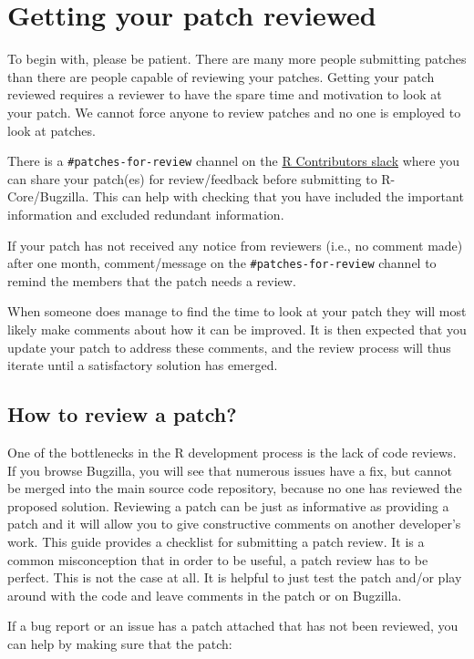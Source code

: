 \documentclass[
  letterpaper,
  DIV=11,
  numbers=noendperiod]{scrreprt}
\begin{document}
\section{Getting your patch reviewed}\label{PatchesReview}

To begin with, please be patient. There are many more people submitting
patches than there are people capable of reviewing your patches. Getting
your patch reviewed requires a reviewer to have the spare time and
motivation to look at your patch. We cannot force anyone to review
patches and no one is employed to look at patches.

There is a \texttt{\#patches-for-review} channel on the
\href{https://r-contributors.slack.com/}{R Contributors slack} where you
can share your patch(es) for review/feedback before submitting to
R-Core/Bugzilla. This can help with checking that you have included the
important information and excluded redundant information.

If your patch has not received any notice from reviewers (i.e., no
comment made) after one month, comment/message on the
\texttt{\#patches-for-review} channel to remind the members that the
patch needs a review.

When someone does manage to find the time to look at your patch they
will most likely make comments about how it can be improved. It is then
expected that you update your patch to address these comments, and the
review process will thus iterate until a satisfactory solution has
emerged.

\subsection{How to review a patch?}\label{how-to-review-a-patch}

One of the bottlenecks in the R development process is the lack of code
reviews. If you browse Bugzilla, you will see that numerous issues have
a fix, but cannot be merged into the main source code repository,
because no one has reviewed the proposed solution. Reviewing a patch can
be just as informative as providing a patch and it will allow you to
give constructive comments on another developer's work. This guide
provides a checklist for submitting a patch review. It is a common
misconception that in order to be useful, a patch review has to be
perfect. This is not the case at all. It is helpful to just test the
patch and/or play around with the code and leave comments in the patch
or on Bugzilla.

If a bug report or an issue has a patch attached that has not been
reviewed, you can help by making sure that the patch:
\end{document}
